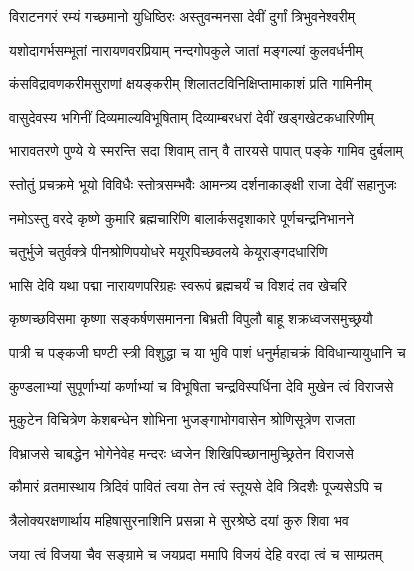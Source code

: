 


\twolineshloka
{विराटनगरं रम्यं गच्छमानो युधिष्ठिरः}
{अस्तुवन्मनसा देवीं दुर्गां त्रिभुवनेश्वरीम्}%

\twolineshloka
{यशोदागर्भसम्भूतां नारायणवरप्रियाम्}
{नन्दगोपकुले जातां मङ्गल्यां कुलवर्धनीम्}%

\twolineshloka
{कंसविद्रावणकरीमसुराणां क्षयङ्करीम्}
{शिलातटविनिक्षिप्तामाकाशं प्रति गामिनीम्}%

\twolineshloka
{वासुदेवस्य भगिनीं दिव्यमाल्यविभूषिताम्}
{दिव्याम्बरधरां देवीं खड्गखेटकधारिणीम्}%

\twolineshloka
{भारावतरणे पुण्ये ये स्मरन्ति सदा शिवाम्}
{तान् वै तारयसे पापात् पङ्के गामिव दुर्बलाम्}%

\twolineshloka
{स्तोतुं प्रचक्रमे भूयो विविधैः स्तोत्रसम्भवैः}
{आमन्त्र्य दर्शनाकाङ्क्षी राजा देवीं सहानुजः}%

\twolineshloka
{नमोऽस्तु वरदे कृष्णे कुमारि ब्रह्मचारिणि}
{बालार्कसदृशाकारे पूर्णचन्द्रनिभानने}%

\twolineshloka
{चतुर्भुजे चतुर्वक्त्रे पीनश्रोणिपयोधरे}
{मयूरपिच्छवलये केयूराङ्गदधारिणि}%

\twolineshloka
{भासि देवि यथा पद्मा नारायणपरिग्रहः}
{स्वरूपं ब्रह्मचर्यं च विशदं तव खेचरि}%

\twolineshloka
{कृष्णच्छविसमा कृष्णा सङ्कर्षणसमानना}
{बिभ्रती विपुलौ बाहू शक्रध्वजसमुच्छ्रयौ}%

\twolineshloka
{पात्री च पङ्कजी घण्टी स्त्री विशुद्धा च या भुवि}
{पाशं धनुर्महाचक्रं विविधान्यायुधानि च}%

\twolineshloka
{कुण्डलाभ्यां सुपूर्णाभ्यां कर्णाभ्यां च विभूषिता}
{चन्द्रविस्पर्धिना देवि मुखेन त्वं विराजसे}%

\twolineshloka
{मुकुटेन विचित्रेण केशबन्धेन शोभिना}
{भुजङ्गाभोगवासेन श्रोणिसूत्रेण राजता}%

\twolineshloka
{विभ्राजसे चाबद्धेन भोगेनेवेह मन्दरः}
{ध्वजेन शिखिपिच्छानामुच्छ्रितेन विराजसे}%

\twolineshloka
{कौमारं व्रतमास्थाय त्रिदिवं पावितं त्वया}
{तेन त्वं स्तूयसे देवि त्रिदशैः पूज्यसेऽपि च}%

\twolineshloka
{त्रैलोक्यरक्षणार्थाय महिषासुरनाशिनि}
{प्रसन्ना मे सुरश्रेष्ठे दयां कुरु शिवा भव}%

\twolineshloka
{जया त्वं विजया चैव सङ्ग्रामे च जयप्रदा}
{ममापि विजयं देहि वरदा त्वं च साम्प्रतम्}%

